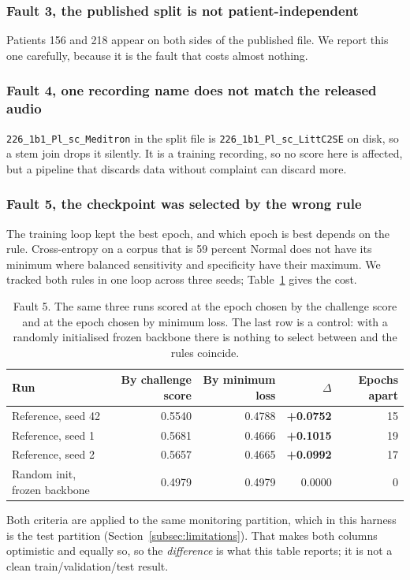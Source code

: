 \documentclass[journal,onecolumn]{IEEEtran}
\newcommand{\best}[1]{\textbf{#1}}
\begin{document}
\subsubsection{Fault 3, the published split is not patient-independent}
Patients 156 and 218 appear on both sides of the published file. We report this one
carefully, because it is the fault that costs almost nothing.

\subsubsection{Fault 4, one recording name does not match the released audio}
\texttt{226\_1b1\_Pl\_sc\_Meditron} in the split file is \texttt{226\_1b1\_Pl\_sc\_LittC2SE}
on disk, so a stem join drops it silently. It is a training recording, so no score here is
affected, but a pipeline that discards data without complaint can discard more.

\subsubsection{Fault 5, the checkpoint was selected by the wrong rule}
The training loop kept the best epoch, and which epoch is best depends on the rule.
Cross-entropy on a corpus that is 59 percent Normal does not have its minimum where balanced
sensitivity and specificity have their maximum. We tracked both rules in one loop across
three seeds; Table~\ref{tab:selection} gives the cost.

\begin{table}[!t]
\centering
\caption{Fault 5. The same three runs scored at the epoch chosen by the challenge score and
at the epoch chosen by minimum loss. The last row is a control: with a randomly initialised
frozen backbone there is nothing to select between and the rules coincide.}
\label{tab:selection}
\footnotesize
\begin{tabular}{lrrrr}
\toprule
Run & By challenge score & By minimum loss & $\Delta$ & Epochs apart \\
\midrule
Reference, seed 42 & 0.5540 & 0.4788 & \best{+0.0752} & 15 \\
Reference, seed 1  & 0.5681 & 0.4666 & \best{+0.1015} & 19 \\
Reference, seed 2  & 0.5657 & 0.4665 & \best{+0.0992} & 17 \\
Random init, frozen backbone & 0.4979 & 0.4979 & 0.0000 & \phantom{0}0 \\
\bottomrule
\end{tabular}

\vspace{2pt}
\footnotesize Both criteria are applied to the same monitoring partition, which in this
harness is the test partition (Section~\ref{subsec:limitations}). That makes both columns
optimistic and equally so, so the \emph{difference} is what this table reports; it is not a
clean train/validation/test result.
\end{table}
\end{document}

